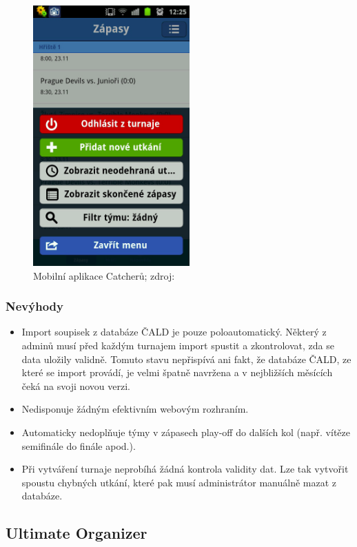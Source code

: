 \begin{figure}[ht!]
\centering
\includegraphics[width=60mm]{./images/catcher.png}
\caption{Mobilní aplikace Catcherů; zdroj: \cite{catcher-play}\label{overflow}}
\label{fig:uwsgi}
\end{figure}

\subsubsection*{Nevýhody}
\begin{itemize}
  \item Import soupisek z databáze ČALD je pouze poloautomatický. Některý z adminů musí před každým turnajem
    import spustit a zkontrolovat, zda se data uložily validně. Tomuto stavu nepřispívá ani fakt,
    že databáze ČALD, ze které se import provádí, je velmi špatně navržena a v nejbližších měsících čeká na svoji novou verzi.
  \item Nedisponuje žádným efektivním webovým rozhraním.
  \item Automaticky nedoplňuje týmy v zápasech play-off do dalších kol (např. vítěze semifinále do finále apod.).
  \item Při vytváření turnaje neprobíhá žádná kontrola validity dat.
    Lze tak vytvořit spoustu chybných utkání, které pak musí administrátor manuálně mazat z databáze. 
\end{itemize}

\subsection*{Ultimate Organizer}

